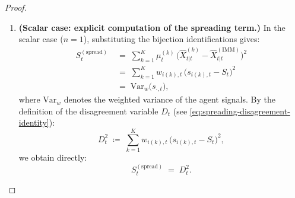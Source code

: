 \documentclass[12pt,openany]{book}
\numberwithin{equation}{chapter}
\theoremstyle{plain}
\theoremstyle{definition}
\theoremstyle{remark}
\begin{document}
\begin{proof}
\begin{enumerate}
  \item \textbf{(Scalar case: explicit computation of the
        spreading term.)}
        In the scalar case ($n=1$), substituting the bijection
        identifications gives:
        \begin{align}
          S_t^{(\mathrm{spread})}
          &\;=\; \sum_{k=1}^{K} \mu_t^{(k)}\,
            \bigl(\hat{X}_{t|t}^{(k)}
            - \hat{X}_{t|t}^{(\mathrm{IMM})}\bigr)^2
          \label{eq:scalar-spread-step1} \\
          &\;=\; \sum_{k=1}^{K} w_{i(k),t}\,
            \bigl(s_{i(k),t} - S_t\bigr)^2
          \label{eq:scalar-spread-step2} \\
          &\;=\; \mathrm{Var}_w\bigl(s_{\cdot,t}\bigr),
          \label{eq:scalar-spread-step3}
        \end{align}
        where $\mathrm{Var}_w$ denotes the weighted variance
        of the agent signals.  By the definition of the
        disagreement variable $D_t$ (see
        \eqref{eq:spreading-disagreement-identity}):
        \begin{equation}
          D_t^2
          \;\coloneqq\;
          \sum_{k=1}^{K} w_{i(k),t}\,
          \bigl(s_{i(k),t} - S_t\bigr)^2,
          \label{eq:Dt-sq-def}
        \end{equation}
        we obtain directly:
        \begin{equation}
          S_t^{(\mathrm{spread})} \;=\; D_t^2.
          \label{eq:spread-equals-Dt-sq}
        \end{equation}


\end{enumerate}
\end{proof}
\end{document}
